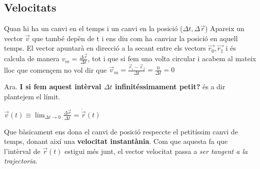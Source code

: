 \documentclass[12pt]{article}
\begin{document}
\subsection{Velocitats}

Quan hi ha un canvi en el temps i un canvi en la posició ($\Delta t, \Delta \vec{r}$) Apareix un vector $\vec{v}$ que també depèn de t i ens diu com ha canviar la posició en aquell temps. El vector apuntarà en direcció a la secant entre els vectors $\vec{r_0}, \vec{r_1}$ i és calcula de manera $v_m = \frac{\Delta \vec{r}}{\Delta t}$, tot i que si fem una volta circular i acabem al mateix lloc que començem no vol dir que $\vec{v}_m = \frac{\vec{r}_i - \vec{r}_f}{\Delta t} = \frac{0}{\Delta t} = 0$

\begin{center}
\end{center}

Ara. \textbf{I si fem aquest intèrval $\Delta t$ infinitéssimament petit?} és a dir plantejem el límit.

$\vec{v}(t) \equiv \lim_{\Delta t \rightarrow 0} \frac{\Delta \vec{r}}{\Delta t} = \dot{\vec{r}}(t)$

Que bàsicament ens dona el canvi de posició respeccte el petitíssim canvi de temps, donant així una \textbf{velocitat instantània}. Com que aquesta fa que l'intèrval de $\vec{r}(t)$ estigui més junt, el vector velocitat passa a \textit{ser tangent a la trajectoria}.

\begin{center}
\end{center}
\end{document}
